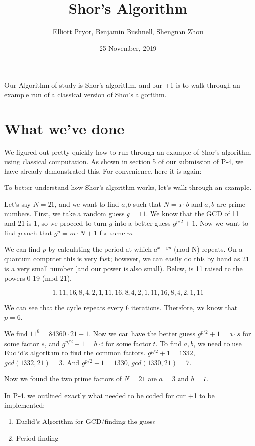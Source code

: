 \documentclass[a4paper]{article}
\title{Shor's Algorithm}
\author{Elliott Pryor, Benjamin Bushnell, Shengnan Zhou}
\date{25 November, 2019}
\begin{document}
\maketitle %

Our Algorithm of study is Shor's algorithm, and our +1 is to walk through an
example run of a classical version of Shor's algorithm.

\section{What we've done}

We figured out pretty quickly how to run through an example of Shor's algorithm
using classical computation. As shown in section 5 of our submission of P-4, we have already
demonstrated this. For convenience, here it is again:

To better understand how Shor's algorithm works, let's walk through an example.

Let's say $N=21$, and we want to find $a, b$ such that $N = a \cdot b$ and $a, b$ are prime numbers.
First, we take a random guess $g=11$. We know that the GCD of 11 and 21 is 1, so we proceed to turn $g$ into a better guess $g^{p/2} \pm 1$.
Now we want to find $p$ such that $g^p = m \cdot N + 1$ for some $m$.

We can find $p$ by calculating the period at which $a ^{x+ yp}$ (mod N) repeats. On a quantum computer this is very fast;
however, we can easily do this by hand as 21 is a very small number (and our power is also small).
Below, is 11 raised to the powers 0-19 (mod 21).

$$1, 11, 16, 8, 4, 2, 1, 11, 16, 8, 4, 2, 1, 11, 16, 8, 4, 2, 1, 11$$

We can see that the cycle repeats every 6 iterations. Therefore, we know that $p = 6$.

We find $11^ 6 = 84360 \cdot 21 + 1$. Now we can have the better guess $g^{p/2} + 1 = a \cdot s$ for some factor $s$,
and $g^{p/2} - 1 = b \cdot t$ for some factor $t$. To find $a,b$, we need to use Euclid's algorithm to find the common factors.
$g^{p/2} + 1 = 1332$, $gcd(1332, 21) = 3$. And $g^{p/2} - 1 = 1330$, $gcd(1330, 21) = 7$.

Now we found the two prime factors of $N=21$ are $a = 3$ and $b = 7$.

\hrulefill

In P-4, we outlined exactly what needed to be coded for our +1 to be implemented:
\begin{enumerate}
\item Euclid's Algorithm for GCD/finding the guess
\item Period finding
\end{enumerate}
\end{document}
